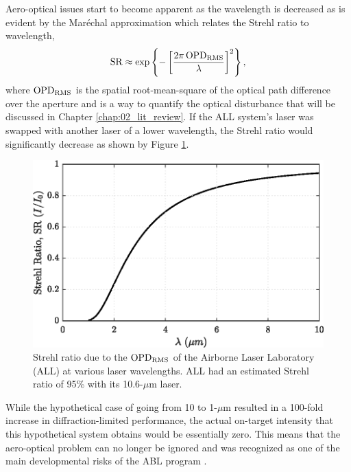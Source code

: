 Aero-optical issues start to become apparent as the wavelength is decreased as is evident by the Mar\'echal approximation \cite{Mahajan-1983-hg7ahvJM} which relates the Strehl ratio to wavelength,
\begin{equation}
  \operatorname{SR} \approx \exp\left\{-\left[\frac{2\pi \operatorname{OPD_{RMS}}}{\lambda}\right]^2\right\} \textrm{,}
  \label{eqn:01_strehl_ratio}
\end{equation}
where $\operatorname{OPD_{RMS}}$ is the spatial root-mean-square of the optical path difference over the aperture and is a way to quantify the optical disturbance that will be discussed in Chapter \ref{chap:02_lit_review}.
If the ALL system's laser was swapped with another laser of a lower wavelength, the Strehl ratio would significantly decrease as shown by Figure \ref{fig:01_strehl_ratio}.
\begin{figure}
  \centering
  \includegraphics{../matlab/01_introduction/strehl_ratio.eps}
  \caption{Strehl ratio due to the $\operatorname{OPD_{RMS}}$ of the Airborne Laser Laboratory (ALL) at various laser wavelengths.  ALL had an estimated Strehl ratio of 95\% with its 10.6-$\mu$m laser.}
  \label{fig:01_strehl_ratio}
\end{figure}
While the hypothetical case of going from 10 to 1-$\mu$m resulted in a 100-fold increase in diffraction-limited performance, the actual on-target intensity that this hypothetical system obtains would be essentially zero.
This means that the aero-optical problem can no longer be ignored and was recognized as one of the main developmental risks of the ABL program \cite{DOTE-1999-HnkadUEw}.
{\color{red}{Do you have or know of a source that at the very least alludes to the aero-optical issues with ABL that greatly limited its field of regard?}}

